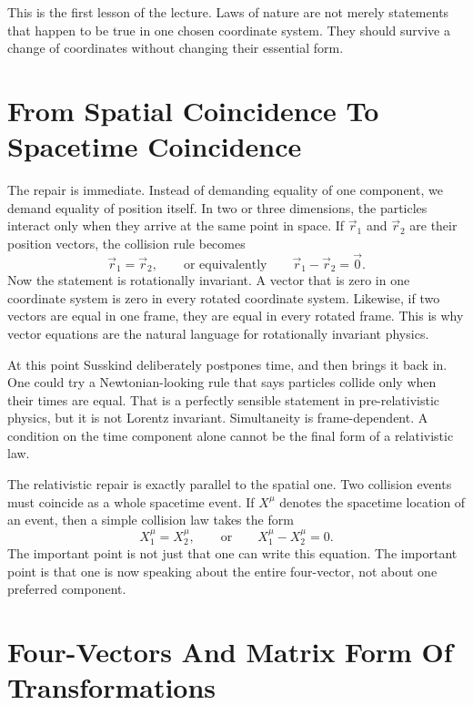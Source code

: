 This is the first lesson of the lecture. Laws of nature are not merely statements that happen to be true in one chosen coordinate system. They should survive a change of coordinates without changing their essential form.

\section{From Spatial Coincidence To Spacetime Coincidence}

The repair is immediate. Instead of demanding equality of one component, we demand equality of position itself. In two or three dimensions, the particles interact only when they arrive at the same point in space. If \(\vec r_1\) and \(\vec r_2\) are their position vectors, the collision rule becomes
\begin{equation}
\vec r_1=\vec r_2,
\qquad\text{or equivalently}\qquad
\vec r_1-\vec r_2=\vec 0.
\end{equation}
Now the statement is rotationally invariant. A vector that is zero in one coordinate system is zero in every rotated coordinate system. Likewise, if two vectors are equal in one frame, they are equal in every rotated frame. This is why vector equations are the natural language for rotationally invariant physics.

At this point Susskind deliberately postpones time, and then brings it back in. One could try a Newtonian-looking rule that says particles collide only when their times are equal. That is a perfectly sensible statement in pre-relativistic physics, but it is not Lorentz invariant. Simultaneity is frame-dependent. A condition on the time component alone cannot be the final form of a relativistic law.

The relativistic repair is exactly parallel to the spatial one. Two collision events must coincide as a whole spacetime event. If \(X^\mu\) denotes the spacetime location of an event, then a simple collision law takes the form
\begin{equation}
X_1^\mu=X_2^\mu,
\qquad\text{or}\qquad
X_1^\mu-X_2^\mu=0.
\end{equation}
The important point is not just that one can write this equation. The important point is that one is now speaking about the entire four-vector, not about one preferred component.

\section{Four-Vectors And Matrix Form Of Transformations}


